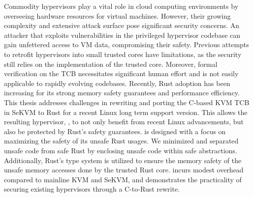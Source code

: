 \begin{abstract*}

Commodity hypervisors play a vital role in cloud computing environments by
overseeing hardware resources for virtual machines. However, their growing
complexity and extensive attack surface pose significant security concerns.
An attacker that exploits vulnerabilities in the privileged hypervisor
codebase can gain unfettered access to VM data, compromising their safety.
Previous attempts to retrofit hypervisors into small trusted cores have
limitations, as the security still relies on the implementation of the trusted
core. Moreover, formal verification on the TCB necessitates significant human
effort and is not easily applicable to rapidly evolving codebases.
Recently, Rust adoption has been increasing for its strong memory safety
guarantees and performance efficiency.
This thesis addresses challenges in rewriting and porting the C-based KVM TCB
in SeKVM to Rust for a recent Linux long term support version. This allows the
resulting hypervisor, \rustsec{}, to not only benefit from recent Linux
advancements, but also be protected by Rust's safety guarantees.
\rustsec{} is designed with a focus on maximizing the safety of its unsafe
Rust usages.
We minimized and separated unsafe code from safe Rust by enclosing unsafe code
within safe abstractions.
Additionally, Rust's type system is utilized to ensure the memory safety
of the unsafe memory accesses done by the trusted Rust core.
\rustsec{} incurs modest overhead compared to mainline KVM and SeKVM, and
demonstrates the practicality of securing existing hypervisors through a
C-to-Rust rewrite.

\end{abstract*}
